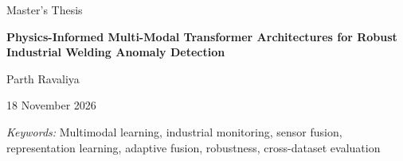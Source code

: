 \documentclass[12pt,a4paper,oneside]{report}
\newcommand{\thesistitle}{Physics-Informed Multi-Modal Transformer Architectures for Robust Industrial Welding Anomaly Detection}
\begin{document}
\ifdefined\ThesisReviewCopy
\else
\hypersetup{pageanchor=false}
\begin{titlepage}
\centering
\vspace*{17mm}
{\large Master's Thesis\par}
\vspace{17mm}
{\LARGE\bfseries \thesistitle\par}
\vspace{23mm}
{\Large Parth Ravaliya\par}
\vfill
{\large 18 November 2026\par}
\vspace{8mm}
\end{titlepage}
\hypersetup{pageanchor=true}
\fi
\ThesisAbstractHeading{}
\begingroup\apaprose
\noindent

\textit{Keywords:} Multimodal learning, industrial monitoring,
sensor fusion, representation learning, adaptive fusion, robustness,
cross-dataset evaluation\par
\endgroup
\clearpage
\ifdefined\ThesisReviewCopy\else
\tableofcontents\listoffigures\listoftables
\clearpage{}
\fi
\apaprose










\ifdefined\ThesisReviewCopy\else

\clearpage
\printbibliography[heading=bibintoc,title={References}]
\appendix









\fi
\end{document}
